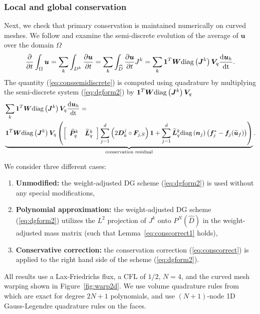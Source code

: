 \documentclass[10pt]{amsart}
\theoremstyle{definition}
\theoremstyle{lemma}
\theoremstyle{theorem}
\theoremstyle{assumption}
\renewcommand{\hat}{\widehat}
\renewcommand{\tilde}{\widetilde}
\newcommand{\td}[2]{\frac{{\rm d}#1}{{\rm d}{\rm #2}}}
\newcommand{\pd}[2]{\frac{\partial#1}{\partial#2}}
\newcommand{\LRp}[1]{\left( #1 \right)}
\newcommand{\LRs}[1]{\left[ #1 \right]}
\newcommand{\diag}[1]{{\rm diag}\LRp{#1}}
\begin{document}
{\subsubsection{Local and global conservation}
\label{sec:conservationcheck}
Next, we check that primary conservation is maintained numerically on curved meshes.  We follow \cite{friedrich2017entropy} and examine the semi-discrete evolution of the average of $\bm{u}$ over the domain $\Omega$
\begin{align}
\pd{}{t}\int_{\Omega} \bm{u} = \sum_k \int_{D^k} \pd{\bm{u}}{t} = \sum_k \int_{\hat{D}} \pd{\bm{u}}{t} J^k = \sum_k \bm{1}^T \bm{W}\diag{\bm{J}^k} \bm{V}_q \td{\bm{u}_h}{t}.  
\label{eq:conssemidiscrete}
\end{align}
The quantity (\ref{eq:conssemidiscrete}) is computed using quadrature by multiplying the semi-discrete system (\ref{eq:dgform2}) by $\bm{1}^T\bm{W}\diag{\bm{J}^k} \bm{V}_q$
\begin{align}
&\sum_k \bm{1}^T \bm{W}\diag{\bm{J}^k} \bm{V}_q \td{\bm{u}_h}{t}= \nonumber\\
& \underbrace{\bm{1}^T\bm{W}\diag{\bm{J}^k}\bm{V}_q\LRp{
 \LRs{\begin{array}{cc}\tilde{\bm{P}}^k_q & \tilde{\bm{L}}^k_q\end{array}} \sum_{j=1}^d \LRp{2\bm{D}^j_k \circ \bm{F}_{j,S}}\bm{1} + \sum_{j=1}^d \tilde{\bm{L}}^k_q \diag{\bm{n}_j}\LRp{\bm{f}_j^* - \bm{f}_j(\tilde{\bm{u}}_f)}}}_{\text{conservation residual}}.
 \label{eq:consres}
\end{align}

We consider three different cases:
\begin{enumerate}
\item \textbf{Unmodified:} the weight-adjusted DG scheme (\ref{eq:dgform2}) is used without any special modifications,
\item \textbf{Polynomial approximation:} the weight-adjusted DG scheme (\ref{eq:dgform2}) utilizes the $L^2$ projection of $J^k$ onto $P^N(\hat{D})$ in the weight-adjusted mass matrix (such that Lemma~\ref{eq:conscorrect1} holds), 
\item \textbf{Conservative correction:} the conservation correction (\ref{eq:conscorrect}) is applied to the right hand side of the scheme (\ref{eq:dgform2}).  
\end{enumerate}
All results use a Lax-Friedrichs flux, a CFL of $1/2$, $N=4$, and the curved mesh warping shown in Figure~\ref{fig:warp2d}.  We use volume quadrature rules from \cite{xiao2010quadrature} which are exact for degree $2N+1$ polynomials, and use $(N+1)$-node 1D Gauss-Legendre quadrature rules on the faces.  

}
\end{document}
